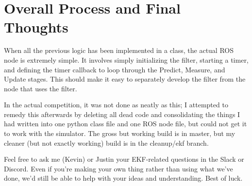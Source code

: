 \section{Overall Process and Final Thoughts}

When all the previous logic has been implemented in a class, the actual ROS node is extremely simple. It involves simply initializing the filter, starting a timer, and defining the timer callback to loop through the Predict, Measure, and Update stages. This should make it easy to separately develop the filter from the node that uses the filter. 

In the actual competition, it was not done as neatly as this; I attempted to remedy this afterwards by deleting all dead code and consolidating the things I had written into one python class file and one ROS node file, but could not get it to work with the simulator. The gross but working build is in master, but my cleaner (but not exactly working) build is in the cleanup/ekf branch. 

Feel free to ask me (Kevin) or Justin your EKF-related questions in the Slack or Discord. Even if you're making your own thing rather than using what we've done, we'd still be able to help with your ideas and understanding. Best of luck.